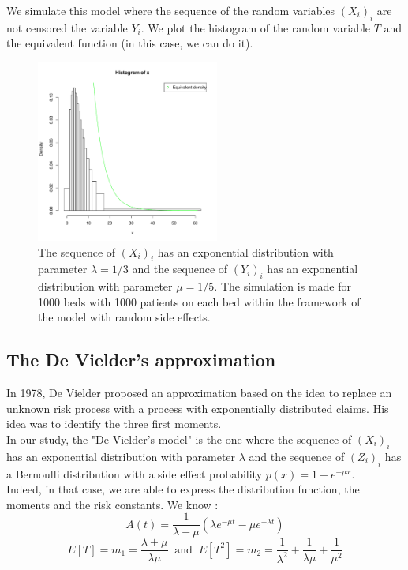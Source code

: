 \documentclass[12pt,twoside]{article}
\begin{document}
We simulate this model where the sequence of the random variables $(X_i)_i$
are not censored the variable $Y_i$. We plot the histogram of the random
variable $T$ and the equivalent function (in this case, we can do it).

\begin{figure}[htb!]
\begin{center}
\includegraphics[width=6cm]{image_mod2_exp13_exp15.pdf} 
\end{center}
\caption{ The sequence of $(X_i)_i$ has an exponential distribution with parameter $\lambda=1/3$ and 
the sequence of $(Y_i)_i$ has an exponential distribution with parameter $\mu=1/5$. The simulation is made for 1000  beds with 1000 patients on each bed within the framework of the model with random side effects.} 
\label{image_mod2}
\end{figure}


\subsection{The De Vielder's approximation}

In 1978, De Vielder proposed an approximation based on the idea to replace an unknown risk process with 
a process with exponentially distributed claims. His idea was to identify the three first moments. \\

In our study, the "De Vielder's model" is the one where the sequence of $(X_i)_i$ has an exponential 
distribution with parameter $\lambda$ and the sequence of $(Z_i)_i$ has a Bernoulli distribution 
with a side effect probability $p(x)=1-e^{-\mu x}$.\\

Indeed, in that case, we are able to express the distribution function, the moments and the risk constants. We know : 
$$A(t) =  \frac{1}{\lambda - \mu}(\lambda e^{-\mu t}-\mu e^{-\lambda t})$$
\begin{equation}
E[T]= m_1 = \frac{\lambda+\mu}{\lambda \mu} ~ \textrm{ and } ~ E[T^2]= m_2 = \frac{1}{\lambda^2}+\frac{1}{\lambda \mu}+ \frac{1}{\mu^2} 
\label{DV_moments}
\end{equation}
\end{document}

